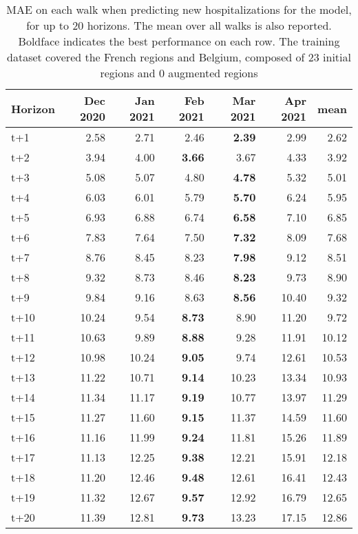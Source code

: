 \begin{table}[H]
\centering
\caption{MAE on each walk when predicting new hospitalizations for the model, for up to 20 horizons. The mean over all walks is also reported. Boldface indicates the best performance on each row. The training dataset covered the French regions and Belgium, composed of 23 initial regions and 0 augmented regions }
\label{tab:MAE_walk_baseline}
\begin{tabular}{lrrrrrr}
\toprule
Horizon &  Dec 2020 &  Jan 2021 &  Feb 2021 &  Mar 2021 &  Apr 2021 &  mean \\
\midrule
t+1  & 2.58  & 2.71  & 2.46  & \textbf{2.39}  & 2.99  & 2.62  \\
t+2  & 3.94  & 4.00  & \textbf{3.66}  & 3.67  & 4.33  & 3.92  \\
t+3  & 5.08  & 5.07  & 4.80  & \textbf{4.78}  & 5.32  & 5.01  \\
t+4  & 6.03  & 6.01  & 5.79  & \textbf{5.70}  & 6.24  & 5.95  \\
t+5  & 6.93  & 6.88  & 6.74  & \textbf{6.58}  & 7.10  & 6.85  \\
t+6  & 7.83  & 7.64  & 7.50  & \textbf{7.32}  & 8.09  & 7.68  \\
t+7  & 8.76  & 8.45  & 8.23  & \textbf{7.98}  & 9.12  & 8.51  \\
t+8  & 9.32  & 8.73  & 8.46  & \textbf{8.23}  & 9.73  & 8.90  \\
t+9  & 9.84  & 9.16  & 8.63  & \textbf{8.56}  & 10.40  & 9.32  \\
t+10  & 10.24  & 9.54  & \textbf{8.73}  & 8.90  & 11.20  & 9.72  \\
t+11  & 10.63  & 9.89  & \textbf{8.88}  & 9.28  & 11.91  & 10.12  \\
t+12  & 10.98  & 10.24  & \textbf{9.05}  & 9.74  & 12.61  & 10.53  \\
t+13  & 11.22  & 10.71  & \textbf{9.14}  & 10.23  & 13.34  & 10.93  \\
t+14  & 11.34  & 11.17  & \textbf{9.19}  & 10.77  & 13.97  & 11.29  \\
t+15  & 11.27  & 11.60  & \textbf{9.15}  & 11.37  & 14.59  & 11.60  \\
t+16  & 11.16  & 11.99  & \textbf{9.24}  & 11.81  & 15.26  & 11.89  \\
t+17  & 11.13  & 12.25  & \textbf{9.38}  & 12.21  & 15.91  & 12.18  \\
t+18  & 11.20  & 12.46  & \textbf{9.48}  & 12.61  & 16.41  & 12.43  \\
t+19  & 11.32  & 12.67  & \textbf{9.57}  & 12.92  & 16.79  & 12.65  \\
t+20  & 11.39  & 12.81  & \textbf{9.73}  & 13.23  & 17.15  & 12.86  \\

\bottomrule
\end{tabular}
\end{table}
